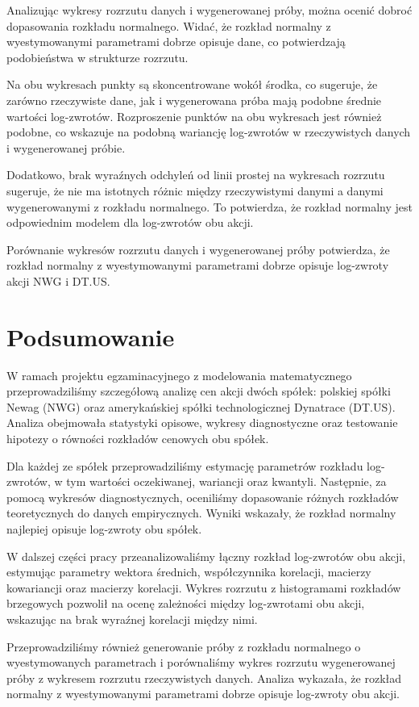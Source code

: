 \documentclass[a4paper,11pt]{article}
\begin{document}
Analizując wykresy rozrzutu danych i wygenerowanej próby, można ocenić dobroć dopasowania rozkładu normalnego. Widać, że rozkład normalny z wyestymowanymi parametrami dobrze opisuje dane, co potwierdzają podobieństwa w strukturze rozrzutu.

Na obu wykresach punkty są skoncentrowane wokół środka, co sugeruje, że zarówno rzeczywiste dane, jak i wygenerowana próba mają podobne średnie wartości log-zwrotów. Rozproszenie punktów na obu wykresach jest również podobne, co wskazuje na podobną wariancję log-zwrotów w rzeczywistych danych i wygenerowanej próbie.

Dodatkowo, brak wyraźnych odchyleń od linii prostej na wykresach rozrzutu sugeruje, że nie ma istotnych różnic między rzeczywistymi danymi a danymi wygenerowanymi z rozkładu normalnego. To potwierdza, że rozkład normalny jest odpowiednim modelem dla log-zwrotów obu akcji.

Porównanie wykresów rozrzutu danych i wygenerowanej próby potwierdza, że rozkład normalny z wyestymowanymi parametrami dobrze opisuje log-zwroty akcji NWG i DT.US.


\section{Podsumowanie}
W ramach projektu egzaminacyjnego z modelowania matematycznego przeprowadziliśmy szczegółową analizę cen akcji dwóch spółek: polskiej spółki Newag (NWG) oraz amerykańskiej spółki technologicznej Dynatrace (DT.US). Analiza obejmowała statystyki opisowe, wykresy diagnostyczne oraz testowanie hipotezy o równości rozkładów cenowych obu spółek.

Dla każdej ze spółek przeprowadziliśmy estymację parametrów rozkładu log-zwrotów, w tym wartości oczekiwanej, wariancji oraz kwantyli. Następnie, za pomocą wykresów diagnostycznych, oceniliśmy dopasowanie różnych rozkładów teoretycznych do danych empirycznych. Wyniki wskazały, że rozkład normalny najlepiej opisuje log-zwroty obu spółek.

W dalszej części pracy przeanalizowaliśmy łączny rozkład log-zwrotów obu akcji, estymując parametry wektora średnich, współczynnika korelacji, macierzy kowariancji oraz macierzy korelacji. Wykres rozrzutu z histogramami rozkładów brzegowych pozwolił na ocenę zależności między log-zwrotami obu akcji, wskazując na brak wyraźnej korelacji między nimi.

Przeprowadziliśmy również generowanie próby z rozkładu normalnego o wyestymowanych parametrach i porównaliśmy wykres rozrzutu wygenerowanej próby z wykresem rozrzutu rzeczywistych danych. Analiza wykazała, że rozkład normalny z wyestymowanymi parametrami dobrze opisuje log-zwroty obu akcji.
\end{document}
